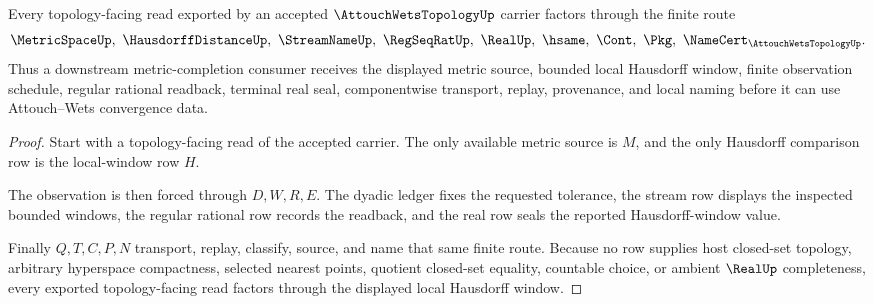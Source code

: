 \begin{theorem}
\label{thm:attouch-wets-topology-local-hausdorff-window}
Every topology-facing read exported by an accepted $\AttouchWetsTopologyUp$ carrier factors through the finite route
$$
\MetricSpaceUp,\ \HausdorffDistanceUp,\ \StreamNameUp,\ \RegSeqRatUp,\ \RealUp,\ \hsame,\ \Cont,\ \Pkg,\ \NameCert_{\AttouchWetsTopologyUp}.
$$
Thus a downstream metric-completion consumer receives the displayed metric source, bounded local Hausdorff window, finite observation schedule, regular rational readback, terminal real seal, componentwise transport, replay, provenance, and local naming before it can use Attouch--Wets convergence data.
\end{theorem}
\begin{proof}
Start with a topology-facing read of the accepted carrier. The only available metric source is $M$, and the only Hausdorff comparison row is the local-window row $H$.

The observation is then forced through $D,W,R,E$. The dyadic ledger fixes the requested tolerance, the stream row displays the inspected bounded windows, the regular rational row records the readback, and the real row seals the reported Hausdorff-window value.

Finally $Q,T,C,P,N$ transport, replay, classify, source, and name that same finite route. Because no row supplies host closed-set topology, arbitrary hyperspace compactness, selected nearest points, quotient closed-set equality, countable choice, or ambient $\RealUp$ completeness, every exported topology-facing read factors through the displayed local Hausdorff window.
\end{proof}


\begin{closurestatus}{\AttouchWetsTopologyUp}
  \theoryclosure{\seedClosure}
  \formalstatus{\unformalizedV}
\end{closurestatus}
